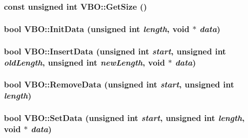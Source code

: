 \hypertarget{class_v_b_o_cd9fa7ebdb18c7d788b076317a07c6ef}{
\subsubsection[{GetSize}]{\setlength{\rightskip}{0pt plus 5cm}const unsigned int VBO::GetSize ()}}
\label{class_v_b_o_cd9fa7ebdb18c7d788b076317a07c6ef}


\hypertarget{class_v_b_o_d44ea0badd80c76c6b49c142ab630151}{
\subsubsection[{InitData}]{\setlength{\rightskip}{0pt plus 5cm}bool VBO::InitData (unsigned int {\em length}, \/  void $\ast$ {\em data})}}
\label{class_v_b_o_d44ea0badd80c76c6b49c142ab630151}


\hypertarget{class_v_b_o_d8bcc72c1a47cc233fc19f3e9bb9da72}{
\subsubsection[{InsertData}]{\setlength{\rightskip}{0pt plus 5cm}bool VBO::InsertData (unsigned int {\em start}, \/  unsigned int {\em oldLength}, \/  unsigned int {\em newLength}, \/  void $\ast$ {\em data})}}
\label{class_v_b_o_d8bcc72c1a47cc233fc19f3e9bb9da72}


\hypertarget{class_v_b_o_3b586a184a4162ae9865846951af35e2}{
\subsubsection[{RemoveData}]{\setlength{\rightskip}{0pt plus 5cm}bool VBO::RemoveData (unsigned int {\em start}, \/  unsigned int {\em length})}}
\label{class_v_b_o_3b586a184a4162ae9865846951af35e2}


\hypertarget{class_v_b_o_fc9f1fd3d2a23ad63f3eecd24d9fe6e9}{
\subsubsection[{SetData}]{\setlength{\rightskip}{0pt plus 5cm}bool VBO::SetData (unsigned int {\em start}, \/  unsigned int {\em length}, \/  void $\ast$ {\em data})}}
\label{class_v_b_o_fc9f1fd3d2a23ad63f3eecd24d9fe6e9}


